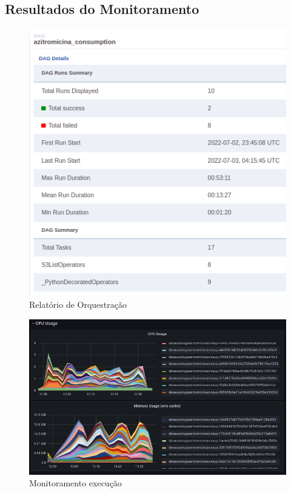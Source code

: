 \documentclass[10pt,brazil]{beamer}
\theoremstyle{definition}
\begin{document}
\subsection{Resultados do Monitoramento}

\begin{frame}[plain]
  \hspace*{-10mm}
  \begin{figure}
    \centering  
  \includegraphics[width=.5\paperwidth]{report_execution_summary1.png}
      \caption[Airflow relatório]{Relatório de Orquestração}
  \end{figure}  
\end{frame}

\begin{frame}[plain]
  \hspace*{-10mm}
  \begin{figure}
    \centering  
  \includegraphics[width=.75\paperwidth]{etl_1_usage.png}
      \caption[Monitoramento execução]{Monitoramento execução}
  \end{figure}  
\end{frame}
\end{document}
